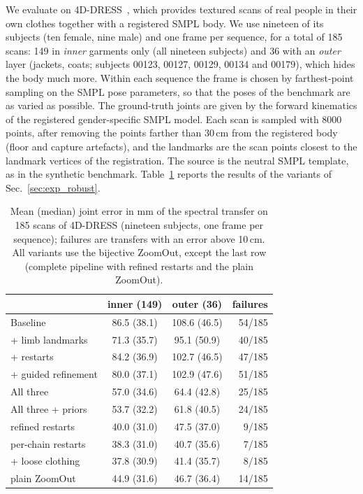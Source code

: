 \documentclass[11pt]{article}
\begin{document}
We evaluate on 4D-DRESS~\citep{wang2024dress}, which provides textured scans
of real people in their own clothes together with a registered SMPL body. We
use nineteen of its subjects (ten female, nine male) and one frame
per sequence, for a total of 185 scans: 149 in \emph{inner} garments only
(all nineteen subjects) and 36 with an \emph{outer} layer (jackets, coats;
subjects 00123, 00127, 00129, 00134 and 00179), which hides the body much
more. Within each sequence the frame is chosen by
farthest-point sampling on the SMPL pose parameters, so that the poses of the
benchmark are as varied as possible. The ground-truth joints are given by the
forward kinematics of the registered gender-specific SMPL model. Each scan is
sampled with 8000 points, after removing the points farther than 30\,cm from
the registered body (floor and capture artefacts), and the landmarks are the
scan points closest to the landmark vertices of the registration. The source
is the neutral SMPL template, as in the synthetic benchmark.
Table~\ref{tab:real} reports the results of the variants of
Sec.~\ref{sec:exp_robust}.

\begin{table}[t]
  \centering
  \caption{Mean (median) joint error in mm of the spectral transfer on 185
  scans of 4D-DRESS (nineteen subjects, one frame per sequence); failures are
  transfers with an error above 10\,cm. All variants use the bijective
  ZoomOut, except the last row (complete pipeline with refined restarts and
  the plain ZoomOut).}
  \label{tab:real}
  \small
  \begin{tabular}{lccr}
    \toprule
    & inner (149) & outer (36) & failures \\
    \midrule
    Baseline                 & 86.5 (38.1) & 108.6 (46.5) & 54/185 \\
    + limb landmarks         & 71.3 (35.7) &  95.1 (50.9) & 40/185 \\
    + restarts               & 84.2 (36.9) & 102.7 (46.5) & 47/185 \\
    + guided refinement      & 80.0 (37.1) & 102.9 (47.6) & 51/185 \\
    All three                & 57.0 (34.6) &  64.4 (42.8) & 25/185 \\
    All three + priors       & 53.7 (32.2) &  61.8 (40.5) & 24/185 \\
    \quad refined restarts   & 40.0 (31.0) & 47.5 (37.0) & 9/185 \\
    \quad per-chain restarts & 38.3 (31.0) & 40.7 (35.6) & 7/185 \\
    \quad + loose clothing   & 37.8 (30.9) & 41.4 (35.7) & 8/185 \\
    \midrule
    \quad plain ZoomOut      & 44.9 (31.6) & 46.7 (36.4) & 14/185 \\
    \bottomrule
  \end{tabular}
\end{table}
\end{document}
